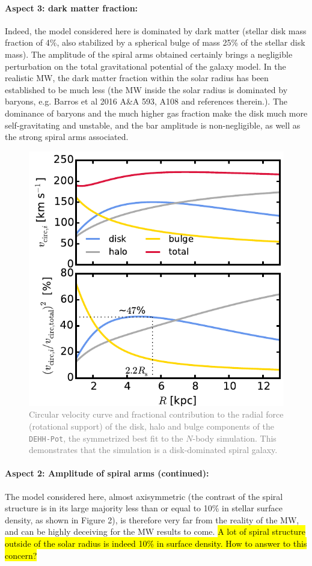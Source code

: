 \documentclass[10pt,a4paper]{article}
\newcommand{\Answer}[1]{\textcolor{Gray}{#1}}
\begin{document}
\paragraph{Aspect 3: dark matter fraction:} Indeed, the model considered here is dominated by dark matter (stellar disk mass fraction of 4\%, also stabilized by a spherical bulge of mass 25\% of the stellar disk mass). The amplitude of the spiral arms obtained certainly brings a negligible
perturbation on the total gravitational potential of the galaxy model. In the
realistic MW, the dark matter fraction within the solar radius has been established
to be much less (the MW inside the solar radius is dominated by baryons, e.g. Barros
et al 2016 A\&A 593, A108 and references therein.). The dominance of baryons and the
much higher gas fraction make the disk much more self-gravitating and unstable, and
the bar amplitude is non-negligible, as well as the strong spiral arms associated.

\begin{figure}[!htbp]
\centering
\includegraphics[width=0.7\columnwidth]{fig/plot_vcirc_decomposed.pdf}
\caption{\Answer{Circular velocity curve and fractional contribution to the radial force (rotational support) of the disk, halo and bulge components of the \texttt{DEHH-Pot}, the symmetrized best fit to the $N$-body simulation. This demonstrates that the simulation is a disk-dominated spiral galaxy.}}
\end{figure}

\paragraph{Aspect 2: Amplitude of spiral arms (continued):} The model considered here, almost axisymmetric (the contrast of the spiral structure is in its large majority less than or equal to 10\% in stellar surface density, as shown in Figure 2),  is therefore very far from the reality of the MW, and can be highly deceiving for the MW results to come. \hl{A lot of spiral structure outside of the solar radius is indeed 10\% in surface density. How to answer to this concern?}
\end{document}
